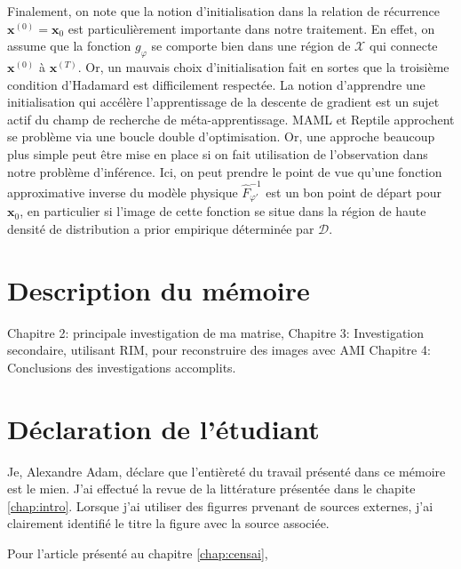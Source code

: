 Finalement, on note que la notion d'initialisation dans la relation de récurrence $\mathbf{x}^{(0)} = \mathbf{x}_0$ est particulièrement 
importante dans notre traitement. En effet, on assume que la fonction $g_\varphi$ se comporte bien dans une région 
de $\mathcal{X}$ qui connecte $\mathbf{x}^{(0)}$ à $\mathbf{x}^{(T)}$. Or, un mauvais choix d'initialisation fait en sortes que 
la troisième condition d'Hadamard est difficilement respectée. La notion d'apprendre une initialisation 
qui accélère l'apprentissage de la descente de gradient est un sujet actif du champ de recherche de méta-apprentissage. 
MAML et Reptile approchent se problème via une boucle double d'optimisation. Or, une approche beaucoup plus simple 
peut être mise en place si on fait utilisation de l'observation dans notre problème d'inférence. Ici, on peut prendre le point 
de vue qu'une fonction approximative inverse du modèle physique $\hat{F}_{\varphi'}^{-1}$ est un bon point de départ pour $\mathbf{x}_0$, 
en particulier si l'image de cette fonction se situe dans la région de haute densité de distribution a prior empirique 
déterminée par $\mathcal{D}$.

\section{Description du mémoire}

Chapitre 2: principale investigation de ma matrise,
Chapitre 3: Investigation secondaire, utilisant RIM, pour reconstruire des images avec AMI
Chapitre 4: Conclusions des investigations accomplits.

\section{Déclaration de l'étudiant}
Je, Alexandre Adam, déclare que l'entièreté du travail présenté dans ce mémoire est le mien. J'ai effectué la revue de 
la littérature présentée dans le chapite \ref{chap:intro}. Lorsque j'ai utiliser des figurres prvenant de sources externes, j'ai clairement 
identifié le titre la figure avec la source associée.

Pour l'article présenté au chapitre \ref{chap:censai}, 

